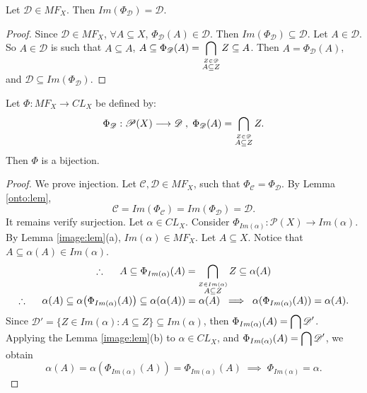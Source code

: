 \documentclass{amsart}
\begin{document}
\begin{lemma}
	Let \(\mathscr{D} \in MF_X\).
	Then 
	\(Im(\Phi _{\mathscr{D}}) = \mathscr{D}\).
	\label{onto:lem}
\end{lemma}
\begin{proof}
	Since \(\mathscr{D} \in MF_X\),
	\(\forall A \subseteq X \),
	\(\Phi _{\mathscr{D}} (A)
	\in \mathscr{D}\).
	Then \(Im(\Phi _{\mathscr{D}}) \subseteq \mathscr{D}\).
	Let \(A \in \mathscr{D}\).
	So \(A \in \mathscr{D}\) is such that \(A \subseteq A\),
	\(
	A \subseteq 
	\Phi _{\mathscr{D}} (A) =
	\displaystyle\bigcap_{\stackrel{Z \in \mathscr{D}}{A \subseteq Z}} Z 
	\subseteq A
	\). 
	Then \(A = \Phi _{\mathscr{D}} (A)\), and 
	\(\mathscr{D} \subseteq Im(\Phi _{\mathscr{D}})\).
\end{proof}

\begin{prop}
Let \(\Phi  : MF_X \longrightarrow CL_X\) be defined by:
\[
\Phi  _ {\mathscr{D}} : 
\mathscr{P} (X) \longrightarrow \mathscr{D} \;,\; 
\Phi _{\mathscr{D}} (A) = 
\displaystyle\bigcap_{\stackrel{Z \in \mathscr{D}}{A \subseteq Z}} Z.
\]
Then \(\Phi\) is a bijection.
\label{bijection:prop}
\end{prop}
\begin{proof}
We prove injection. Let \(\mathscr{C} , \mathscr{D} \in MF_X\), such that
\(\Phi _{\mathscr{C}} = \Phi _{\mathscr{D}}\). By Lemma \ref{onto:lem},
\[
\mathscr{C} = Im (\Phi _{\mathscr{C}}) = Im (\Phi _{\mathscr{D}}) = \mathscr{D}.
\]
It remains verify surjection. Let \(\alpha \in CL_X\).
Consider \(\Phi _{Im(\alpha)} : \mathscr{P} (X) \longrightarrow Im(\alpha)\).
	By Lemma \ref{image:lem}(a), \(Im(\alpha) \in MF_X\).
Let \(A \subseteq X\).
Notice that \(A \subseteq \alpha (A) \in Im(\alpha)\).
\[
\begin{array}{c}
\therefore \hspace{5mm} A \subseteq \Phi _{Im(\alpha)} (A) =
\displaystyle\bigcap_{\stackrel{Z \in Im(\alpha)}{A \subseteq Z}} Z
\subseteq \alpha (A)
\\ 
\therefore \hspace{5mm} 
\alpha (A) 
\subseteq \alpha \big(\Phi _{Im(\alpha)} (A)\big) 
\subseteq \alpha (\alpha (A)) 
= \alpha (A)
\;\implies\; 
\alpha (\Phi _{Im(\alpha)} (A)) = \alpha (A).
\end{array}
\]
Since \(\mathscr{D}' = 
\{Z \in Im(\alpha) : A \subseteq Z\} \subseteq Im(\alpha)\),
then \(\Phi _{Im(\alpha)} (A) = \displaystyle\bigcap \mathscr{D}'\). \\ 
Applying the Lemma \ref{image:lem}(b) to \(\alpha \in CL_X\),
and \(\Phi _{Im(\alpha)} (A) = \displaystyle\bigcap \mathscr{D}'\), we obtain
\[
\alpha (A) = \alpha (\Phi _{Im(\alpha)} (A)) 
= \Phi _{Im(\alpha)} (A)
\;\implies\; 
\Phi _{Im(\alpha)} = \alpha .
\]
\end{proof}
\end{document}
